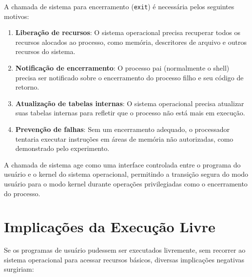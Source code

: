 \documentclass[12pt,a4paper]{article}
\begin{document}
A chamada de sistema para encerramento (\texttt{exit}) é necessária pelos seguintes motivos:

\begin{enumerate}
    \item \textbf{Liberação de recursos}: O sistema operacional precisa recuperar todos os recursos alocados ao processo, como memória, descritores de arquivo e outros recursos do sistema.

    \item \textbf{Notificação de encerramento}: O processo pai (normalmente o shell) precisa ser notificado sobre o encerramento do processo filho e seu código de retorno.

    \item \textbf{Atualização de tabelas internas}: O sistema operacional precisa atualizar suas tabelas internas para refletir que o processo não está mais em execução.

    \item \textbf{Prevenção de falhas}: Sem um encerramento adequado, o processador tentaria executar instruções em áreas de memória não autorizadas, como demonstrado pelo experimento.
\end{enumerate}

A chamada de sistema age como uma interface controlada entre o programa do usuário e o kernel do sistema operacional, permitindo a transição segura do modo usuário para o modo kernel durante operações privilegiadas como o encerramento do processo.

\section{Implicações da Execução Livre}

Se os programas de usuário pudessem ser executados livremente, sem recorrer ao sistema operacional para acessar recursos básicos, diversas implicações negativas surgiriam:
\end{document}
